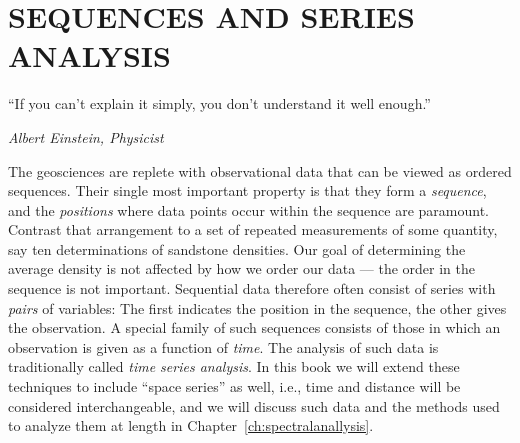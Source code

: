 %
\chapter{SEQUENCES AND SERIES ANALYSIS}
\label{ch:sequences}
\epigraph{``If you can't explain it simply, you don't understand it well enough.''}{\textit{Albert Einstein, Physicist}}
	The geosciences are replete with observational data that can be viewed as ordered sequences.  
Their single most important property is that they form a \emph{sequence}, and the \emph{positions} where 
data points occur within the sequence are paramount.  Contrast that arrangement to a set of repeated 
measurements of some quantity, say ten determinations of sandstone densities.  Our goal of 
determining the average density is not affected by how we order our data --- the order in the 
sequence is not important.  Sequential data therefore often consist of series with \emph{pairs} of 
variables:  The first indicates the position in the sequence, the other gives the observation.  A 
special family of such sequences consists of those in which an observation is given as a function of \emph{time}.  
The analysis of such data is traditionally called \emph{time series analysis}.  In this book we will 
extend these techniques to include ``space series'' as well, i.e., time and distance will be 
considered interchangeable, and we will discuss such data and the methods used to analyze them at
length in Chapter~\ref{ch:spectralanallysis}.
 
